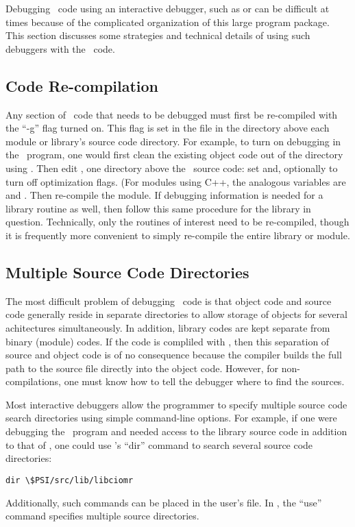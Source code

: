 %
%
%
%
Debugging \PSIthree\ code using an interactive debugger, such as
 or  can be difficult at times because of the
complicated organization of this large program package.  This section
discusses some strategies and technical details of using such
debuggers with the \PSIthree\ code.

\subsection{Code Re-compilation}
Any section of \PSIthree\ code that needs to be debugged must first be
re-compiled with the ``-g'' flag turned on.  This flag is set in the
 file in the directory above each module or library's
source code directory.  For example, to turn on debugging in the
\PSIcscf\ program, one would first clean the existing object code out
of the  directory using .
Then edit , one directory above the
\PSIcscf\ source code: set  and, optionally  to turn off optimization flags.  (For modules using C++, the
analogous variables are  and .  Then
re-compile the module.  If debugging information is needed for a
library routine as well, then follow this same procedure for the
library in question.  Technically, only the routines of interest need
to be re-compiled, though it is frequently more convenient to simply
re-compile the entire library or module.

\subsection{Multiple Source Code Directories}
The most difficult problem of debugging \PSIthree\ code is that object
code and source code generally reside in separate directories to allow
storage of objects for several achitectures simultaneously.  In
addition, library codes are kept separate from binary (module) codes.
If the code is compliled with , then this separation of
source and object code is of no consequence because the compiler
builds the full path to the source file directly into the object code.
However, for non- compilations, one must know how to tell
the debugger where to find the sources.

Most interactive debuggers allow the programmer to specify multiple
source code search directories using simple command-line options.  For
example, if one were debugging the \PSIcscf\ program and needed
access to the  library source code in addition to
that of \PSIcscf, one could use 's ``dir'' command to search
several source code directories:
\begin{verbatim}
dir \$PSI/src/lib/libciomr
\end{verbatim}
Additionally, such commands can be placed in the user's
 file.  In , the ``use'' command
specifies multiple source directories.
